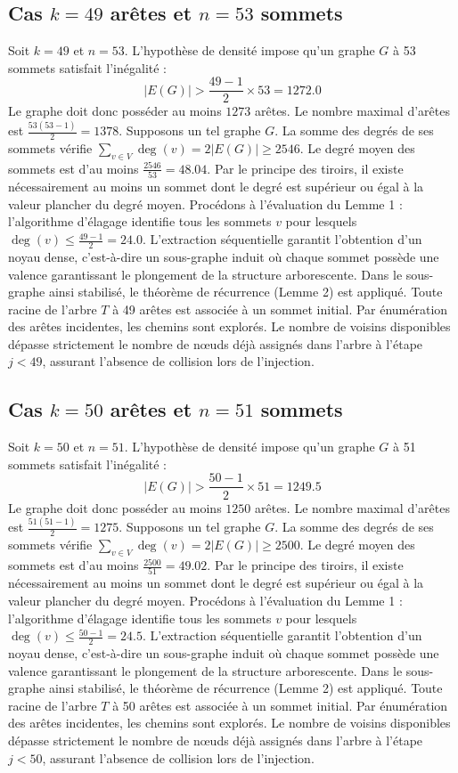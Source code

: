 \documentclass[12pt,a4paper]{article}
\begin{document}
\subsection{Cas $k = 49$ arêtes et $n = 53$ sommets}
Soit $k = 49$ et $n = 53$. L'hypothèse de densité impose qu'un graphe $G$ à 53 sommets satisfait l'inégalité :
$$ |E(G)| > \frac{49-1}{2} \times 53 = 1272.0 $$
Le graphe doit donc posséder au moins $1273$ arêtes. Le nombre maximal d'arêtes est $\frac{53(53-1)}{2} = 1378$.
Supposons un tel graphe $G$. La somme des degrés de ses sommets vérifie $\sum_{v \in V} \deg(v) = 2|E(G)| \geq 2546$.
Le degré moyen des sommets est d'au moins $\frac{2546}{53} = 48.04$.
Par le principe des tiroirs, il existe nécessairement au moins un sommet dont le degré est supérieur ou égal à la valeur plancher du degré moyen.
Procédons à l'évaluation du Lemme 1 : l'algorithme d'élagage identifie tous les sommets $v$ pour lesquels $\deg(v) \leq \frac{49-1}{2} = 24.0$.
L'extraction séquentielle garantit l'obtention d'un noyau dense, c'est-à-dire un sous-graphe induit où chaque sommet possède une valence garantissant le plongement de la structure arborescente.
Dans le sous-graphe ainsi stabilisé, le théorème de récurrence (Lemme 2) est appliqué. Toute racine de l'arbre $T$ à 49 arêtes est associée à un sommet initial. Par énumération des arêtes incidentes, les chemins sont explorés. Le nombre de voisins disponibles dépasse strictement le nombre de nœuds déjà assignés dans l'arbre à l'étape $j < 49$, assurant l'absence de collision lors de l'injection.

\subsection{Cas $k = 50$ arêtes et $n = 51$ sommets}
Soit $k = 50$ et $n = 51$. L'hypothèse de densité impose qu'un graphe $G$ à 51 sommets satisfait l'inégalité :
$$ |E(G)| > \frac{50-1}{2} \times 51 = 1249.5 $$
Le graphe doit donc posséder au moins $1250$ arêtes. Le nombre maximal d'arêtes est $\frac{51(51-1)}{2} = 1275$.
Supposons un tel graphe $G$. La somme des degrés de ses sommets vérifie $\sum_{v \in V} \deg(v) = 2|E(G)| \geq 2500$.
Le degré moyen des sommets est d'au moins $\frac{2500}{51} = 49.02$.
Par le principe des tiroirs, il existe nécessairement au moins un sommet dont le degré est supérieur ou égal à la valeur plancher du degré moyen.
Procédons à l'évaluation du Lemme 1 : l'algorithme d'élagage identifie tous les sommets $v$ pour lesquels $\deg(v) \leq \frac{50-1}{2} = 24.5$.
L'extraction séquentielle garantit l'obtention d'un noyau dense, c'est-à-dire un sous-graphe induit où chaque sommet possède une valence garantissant le plongement de la structure arborescente.
Dans le sous-graphe ainsi stabilisé, le théorème de récurrence (Lemme 2) est appliqué. Toute racine de l'arbre $T$ à 50 arêtes est associée à un sommet initial. Par énumération des arêtes incidentes, les chemins sont explorés. Le nombre de voisins disponibles dépasse strictement le nombre de nœuds déjà assignés dans l'arbre à l'étape $j < 50$, assurant l'absence de collision lors de l'injection.
\end{document}
